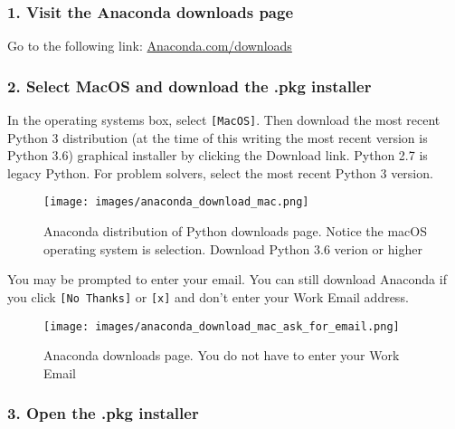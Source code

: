 \documentclass{book}
\makeatletter
\def\maxwidth{\ifdim\Gin@nat@width>\linewidth\linewidth
\else\Gin@nat@width\fi}
\let\Oldincludegraphics\includegraphics
\renewcommand{\includegraphics}[1]{\Oldincludegraphics[width=.8\maxwidth]{#1}}
\newcommand{\passthrough}[1]{#1}
\makeatother
\begin{document}
    
        \hypertarget{visit-the-anaconda-downloads-page}{%
\subsubsection{1. Visit the Anaconda downloads
page}\label{visit-the-anaconda-downloads-page}}

Go to the following link:
\href{https://www.anaconda.com/download/}{Anaconda.com/downloads}
    




    
        \hypertarget{select-macos-and-download-the-.pkg-installer}{%
\subsubsection{2. Select MacOS and download the .pkg
installer}\label{select-macos-and-download-the-.pkg-installer}}

In the operating systems box, select \passthrough{\lstinline![MacOS]!}.
Then download the most recent Python 3 distribution (at the time of this
writing the most recent version is Python 3.6) graphical installer by
clicking the Download link. Python 2.7 is legacy Python. For problem
solvers, select the most recent Python 3 version.

\begin{figure}
\centering
\texttt{[image: images/anaconda\_download\_mac.png]}
\caption{Anaconda distribution of Python downloads page. Notice the
macOS operating system is selection. Download Python 3.6 verion or
higher}
\end{figure}

You may be prompted to enter your email. You can still download Anaconda
if you click \passthrough{\lstinline![No Thanks]!} or
\passthrough{\lstinline![x]!} and don't enter your Work Email address.

\begin{figure}
\centering
\texttt{[image: images/anaconda\_download\_mac\_ask\_for\_email.png]}
\caption{Anaconda downloads page. You do not have to enter your Work
Email}
\end{figure}
    




    
        \hypertarget{open-the-.pkg-installer}{%
\subsubsection{3. Open the .pkg
installer}\label{open-the-.pkg-installer}}
\end{document}
